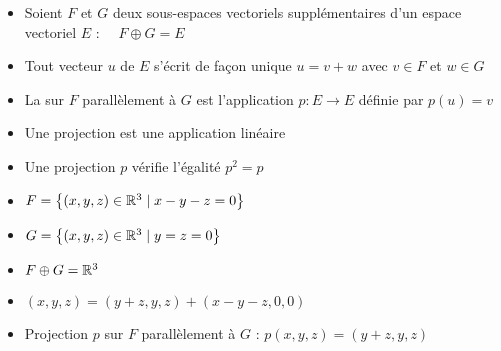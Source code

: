 \begin{frame}


\pause

\begin{itemize}
  \item Soient $F$ et $G$ deux sous-espaces
vectoriels supplémentaires d'un espace vectoriel $E$ : \ \  $F \oplus G = E$
\vspace*{-3ex}
\pause  
  \item Tout vecteur $u$ de $E$ s'écrit de façon unique  $u=v+w$ avec $v \in F$ et $w \in G$
\pause  
  \item La  sur $F$ parallèlement à $G$ est l'application $p : E \to E$
définie par $p(u)=v$

\pause
  \item Une projection est une application linéaire 
\pause
  \item Une projection $p$ vérifie l'égalité $p^2=p$
  
\end{itemize}
\end{frame}


\begin{frame}
\begin{exemple}
\begin{itemize}\setlength{\itemsep}{6pt}
  \item $F=\big\{ (x,y,z) \in \mathbb{R}^3\mid x-y-z=0\big\}$ 
  \item $G=\big\{(x,y,z) \in \mathbb{R}^3 \mid y=z=0 \big\}$
\pause  
  \item $F \oplus G = \mathbb{R}^3$
\pause  
  \item $(x,y,z)=(y+z,y,z)+ (x-y-z, 0,0)$
\pause  
  \item Projection $p$ sur $F$ parallèlement à $G$ : $p(x,y,z)=(y+z,y,z)$

 
\end{itemize}
\end{exemple}
\end{frame}


